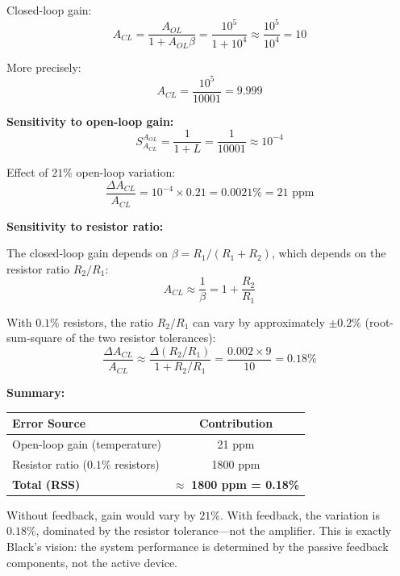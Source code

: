 \begin{example}
Closed-loop gain:
\begin{equation}
A_{CL} = \frac{A_{OL}}{1 + A_{OL}\beta} = \frac{10^5}{1 + 10^4} \approx \frac{10^5}{10^4} = 10
\end{equation}

More precisely:
\begin{equation}
A_{CL} = \frac{10^5}{10001} = 9.999
\end{equation}

\textbf{Sensitivity to open-loop gain:}
\begin{equation}
S^{A_{OL}}_{A_{CL}} = \frac{1}{1 + L} = \frac{1}{10001} \approx 10^{-4}
\end{equation}

Effect of $21\%$ open-loop variation:
\begin{equation}
\frac{\Delta A_{CL}}{A_{CL}} = 10^{-4} \times 0.21 = 0.0021\% = 21 \text{ ppm}
\end{equation}

\textbf{Sensitivity to resistor ratio:}

The closed-loop gain depends on $\beta = R_1/(R_1+R_2)$, which depends on the resistor ratio $R_2/R_1$:
\begin{equation}
A_{CL} \approx \frac{1}{\beta} = 1 + \frac{R_2}{R_1}
\end{equation}

With $0.1\%$ resistors, the ratio $R_2/R_1$ can vary by approximately $\pm 0.2\%$ (root-sum-square of the two resistor tolerances):
\begin{equation}
\frac{\Delta A_{CL}}{A_{CL}} \approx \frac{\Delta(R_2/R_1)}{1 + R_2/R_1} = \frac{0.002 \times 9}{10} = 0.18\%
\end{equation}

\textbf{Summary:}
\begin{center}
\begin{tabular}{lc}
\toprule
\textbf{Error Source} & \textbf{Contribution} \\
\midrule
Open-loop gain (temperature) & 21 ppm \\
Resistor ratio ($0.1\%$ resistors) & 1800 ppm \\
\midrule
\textbf{Total (RSS)} & $\approx$ \textbf{1800 ppm = 0.18\%} \\
\bottomrule
\end{tabular}
\end{center}

Without feedback, gain would vary by $21\%$. With feedback, the variation is $0.18\%$, dominated by the resistor tolerance---not the amplifier. This is exactly Black's vision: the system performance is determined by the passive feedback components, not the active device.
\end{example}

